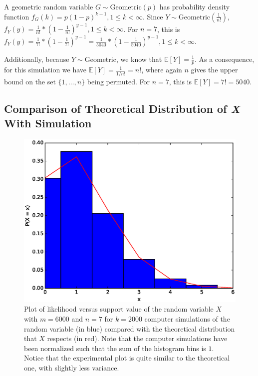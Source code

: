 \documentclass[11pt, oneside]{article}   	%
\begin{document}
A geometric random variable $G \sim \text{Geometric}(p)$ has probability density function $f_G(k) = p(1-p)^{k-1}, 1 \leq k < \infty$. Since $Y \sim \text{Geometric}(\frac{1}{n!})$, $f_Y(y) = \frac{1}{n!} * (1 - \frac{1}{n!})^{y-1}, 1 \leq k < \infty$. For $n = 7$, this is $f_Y(y) = \frac{1}{7!} * (1 - \frac{1}{7!})^{y-1} = \frac{1}{5040} * (1 - \frac{1}{5040})^{y-1}, 1 \leq k < \infty$.

Additionally, because $Y \sim \text{Geometric}$, we know that $\mathbb{E}[Y] = \frac{1}{p}$. As a consequence, for this simulation we have $\mathbb{E}[Y] = \frac{1}{1/n!} = n!$, where again $n$ gives the upper bound on the set $\{1, \dots, n\}$ being permuted. For $n = 7$, this is $\mathbb{E}[Y] = 7! = 5040$.

\subsection{Comparison of Theoretical Distribution of \textit{X} With Simulation}

\begin{figure}
\includegraphics[scale=.5]{part_1_problem_4}
\caption{Plot of likelihood versus support value of the random variable $X$ with $m = 6000$ and $n = 7$ for $k = 2000$ computer simulations of the random variable (in blue) compared with the theoretical distribution that $X$ respects (in red). Note that the computer simulations have been normalized such that the sum of the histogram bins is $1$. Notice that the experimental plot is quite similar to the theoretical one, with slightly less variance.}
\label{fig:x}
\end{figure}
\end{document}
